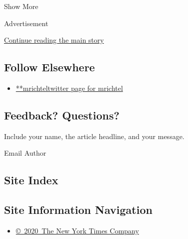 Show More

Advertisement

\protect\hyperlink{after-mid2}{Continue reading the main story}

\hypertarget{follow-elsewhere}{%
\subsection{Follow Elsewhere}\label{follow-elsewhere}}

\begin{itemize}
\tightlist
\item
  \href{https://twitter.com/mrichtel}{**mrichteltwitter page for
  mrichtel}
\end{itemize}

\hypertarget{feedback-questions}{%
\subsection{Feedback? Questions?}\label{feedback-questions}}

Include your name, the article headline, and your message.

Email Author

\hypertarget{site-index}{%
\subsection{Site Index}\label{site-index}}

\hypertarget{site-information-navigation}{%
\subsection{Site Information
Navigation}\label{site-information-navigation}}

\begin{itemize}
\tightlist
\item
  \href{https://help.nytimes3xbfgragh.onion/hc/en-us/articles/115014792127-Copyright-notice}{©~2020~The
  New York Times Company}
\end{itemize}

